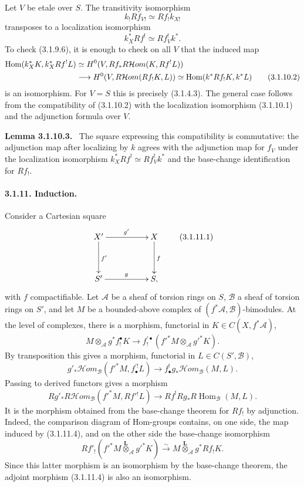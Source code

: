 \documentclass[12pt]{article}
\newcommand{\Aa}{\mathcal A}
\newcommand{\Bb}{\mathcal B}
\DeclareMathOperator{\Hom}{Hom}
\newcommand{\Hhom}{\mathcal{H}om}
\newcommand{\otimesL}{\mathbin{\overset{\mathbf L}{\otimes}}}
\newenvironment{statement}[1]{\par\medskip\noindent\textbf{#1.}\ }{\par\medskip}
\begin{document}
Let $V$ be etale over $S$. The transitivity isomorphism
\[
   k_!Rf_{V!}\simeq Rf_!k_{X!}
\]
transposes to a localization isomorphism
\begin{equation}
   k_X^*Rf^!\simeq Rf_V^!k^*. \tag{3.1.10.1}
\end{equation}
To check (3.1.9.6), it is enough to check on all $V$ that the induced map
\begin{align}
\Hom(k_X^*K,k_X^*Rf^!L)
&\simeq H^0(V,Rf_*R\Hhom(K,Rf^!L)) \notag\\
&\longrightarrow H^0(V,R\Hhom(Rf_!K,L))
 \simeq \Hom(k^*Rf_!K,k^*L) \tag{3.1.10.2}
\end{align}
is an isomorphism. For $V=S$ this is precisely (3.1.4.3). The general case follows from the compatibility of (3.1.10.2) with the localization isomorphism (3.1.10.1) and the adjunction formula over $V$.

\begin{statement}{Lemma 3.1.10.3}
The square expressing this compatibility is commutative: the adjunction map after localizing by $k$ agrees with the adjunction map for $f_V$ under the localization isomorphism $k_X^*Rf^!\simeq Rf_V^!k^*$ and the base-change identification for $Rf_!$.
\end{statement}

\paragraph{3.1.11. Induction.}
Consider a Cartesian square
\begin{equation}
\xymatrix@C=1.8cm@R=1.3cm{
X'\ar[r]^{g'}\ar[d]^{f'}&X\ar[d]^f\\
S'\ar[r]^g&S,
}\tag{3.1.11.1}
\end{equation}
with $f$ compactifiable. Let $\Aa$ be a sheaf of torsion rings on $S$, $\Bb$ a sheaf of torsion rings on $S'$, and let $M$ be a bounded-above complex of $(f^*\Aa,\Bb)$-bimodules. At the level of complexes, there is a morphism, functorial in $K\in C(X,f^*\Aa)$,
\begin{equation}
   M\otimes_\Aa g^*f_!^{\bullet}K\longrightarrow
   f_{!}^{\prime\bullet}({f'}^*M\otimes_\Aa {g'}^*K). \tag{3.1.11.2}
\end{equation}
By transposition this gives a morphism, functorial in $L\in C(S',\Bb)$,
\begin{equation}
   g'_*\Hhom_\Bb({f'}^*M,f_{\bullet}^{\prime!}L)
   \longrightarrow
   f^!_{\bullet}g_*\Hhom_\Bb(M,L). \tag{3.1.11.3}
\end{equation}
Passing to derived functors gives a morphism
\begin{equation}
   Rg'_*R\Hhom_\Bb({f'}^*M,Rf'{}^!L)
   \longrightarrow
   Rf^!Rg_*R\Hom_\Bb(M,L). \tag{3.1.11.4}
\end{equation}
It is the morphism obtained from the base-change theorem for $Rf_!$ by adjunction. Indeed, the comparison diagram of Hom-groups contains, on one side, the map induced by (3.1.11.4), and on the other side the base-change isomorphism
\[
   Rf'_!({f'}^*M\otimesL_\Aa {g'}^*K)
      \xrightarrow{\sim} M\otimesL_\Aa g^*Rf_!K.
\]
Since this latter morphism is an isomorphism by the base-change theorem, the adjoint morphism (3.1.11.4) is also an isomorphism.
\end{document}
